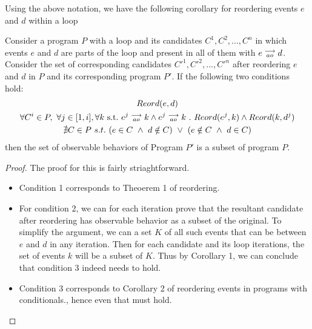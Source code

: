         Using the above notation, we have the following corollary for reordering events $e$ and $d$ within a loop 
        
        \begin{corollary}
            Consider a program $P$ with a loop and its candidates $C^1, C^2, ... , C^n$ in which events $e$ and $d$ are parts of the loop and present in all of them with $e\stackrel{\longrightarrow}{_{ao}}d$. Consider the set of corresponding candidates $C'^1, C'^2, ... , C'^n$ after reordering $e$ and $d$ in $P$ and its corresponding program $P'$. If the following two conditions hold:
            \begin{gather*}
                Reord(e, d) \\ 
                \forall C^i \in P , \ \forall j \in [1,i], \forall k \ \text{s.t.} \ \reln{e^j}{ao}{k} \wedge \reln{e^j}{ao}{k} \ . \ Reord(e^j, k) \wedge Reord(k, d^j)  \\ 
                \nexists C \in P \ s.t. \ 
                    (e \in C \ \wedge \ d \notin C) \ \vee \ 
                    (e \notin C \ \wedge \ d \in C) 
            \end{gather*}
            then the set of observable behaviors of Program $P'$ is a subset of program $P$.     
        \end{corollary}

        \begin{proof}
        
            The proof for this is fairly striaghtforward. 
            
            \begin{itemize}
                \item Condition 1 corresponds to Theoerem 1 of reordering. 
                \item For condition 2, we can for each iteration prove that the resultant candidate after reordering has observable behavior as a subset of the original. To simplify the argument, we can a set $K$ of all such events that can be between $e$ and $d$ in  any iteration. 
                Then for each candidate and its loop iterations, the set of events $k$ will be a subset of $K$. Thus by Corollary 1, we can conclude that condition 3 indeed needs to hold. 
                \item Condition 3 corresponds to Corollary 2 of reordering events in programs with conditionals., hence even that must hold. 
            \end{itemize}
            
        \end{proof}


